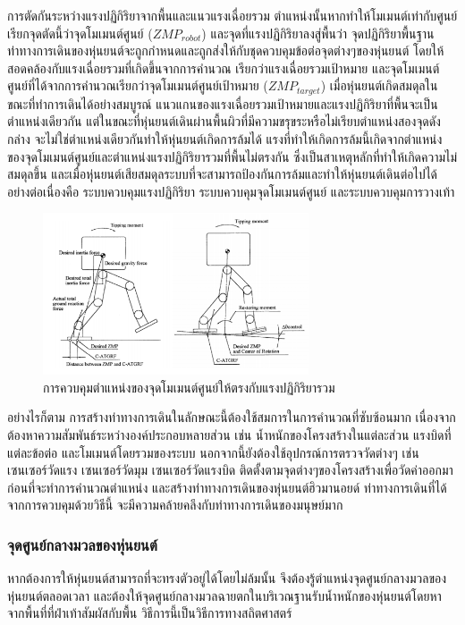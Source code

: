การตัดกันระหว่างแรงปฏิกิริยาจากพื้นและแนวแรงเฉื่อยรวม ตำแหน่งนั้นหากทำให้โมเมนต์เท่ากับศูนย์
เรียกจุดตัดนี้ว่าจุดโมเมนต์ศูนย์ ($ZMP_{robot}$) และจุดที่แรงปฏิกิริยาลงสู่พื้นว่า จุดปฏิกิริยาพื้นฐาน 
ท่าทางการเดินของหุ่นยนต์จะถูกกำหนดและถูกส่งให้กับชุดควบคุมข้อต่อจุดต่างๆของหุ่นยนต์ โดยให้สอดคล้องกับแรงเฉื่อยรวมที่เกิดขึ้นจากการคำนวณ
เรียกว่าแรงเฉื่อยรวมเป้าหมาย และจุดโมเมนต์ศูนย์ที่ได้จากการคำนวณเรียกว่าจุดโมเมนต์ศูนย์เป้าหมาย ($ZMP_{target}$)
เมื่อหุ่นยนต์เกิดสมดุลในขณะที่ทำการเดินได้อย่างสมบูรณ์ แนวแกนของแรงเฉื่อยรวมเป้าหมายและแรงปฏิกิริยาที่พื้นจะเป็นตำแหน่งเดียวกัน
แต่ในขณะที่หุ่นยนต์เดินผ่านพื้นผิวที่มีความขรุขระหรือไม่เรียบตำแหน่งสองจุดดังกล่าง จะไม่ใช่ตำแหน่งเดียวกันทำให้หุ่นยนต์เกิดการล้มได้
แรงที่ทำให้เกิดการล้มนี้เกิดจากตำแหน่งของจุดโมเมนต์ศูนย์และตำแหน่งแรงปฏิกิริยารวมที่พื้นไม่ตรงกัน ซึ่งเป็นสาเหตุหลักที่ทำให้เกิดความไม่สมดุลขึ้น
และเมื่อหุ่นยนต์เสียสมดุลระบบที่จะสามารถป้องกันการล้มและทำให้หุ่นยนต์เดินต่อไปได้อย่างต่อเนื่องคือ ระบบควบคุมแรงปฏิกิริยา
ระบบควบคุมจุดโมเมนต์ศูนย์ และระบบควบคุมการวางเท้า

\begin{figure}[htbp]
	\centering
	\includegraphics[width=0.7\textwidth]{chapter2/images/zmpdynamicwalking.png}
	\caption{การควบคุมตำแหน่งของจุดโมเมนต์ศูนย์ให้ตรงกับแรงปฏิกิริยารวม}
	\label{fig:robot_zmp_support}
\end{figure}

อย่างไรก็ตาม การสร้างท่าทางการเดินในลักษณะนี้ต้องใช้สมการในการคำนวณที่ซับซ้อนมาก
เนื่องจากต้องหาความสัมพันธ์ระหว่างองค์ประกอบหลายส่วน เช่น น้ำหนักของโครงสร้างในแต่ละส่วน 
แรงบิดที่แต่ละข้อต่อ และโมเมนต์โดยรวมของระบบ นอกจากนี้ยังต้องใช้อุปกรณ์การตรวจวัดต่างๆ เช่น เซนเซอร์วัดแรง
เซนเซอร์วัดมุม เซนเซอร์วัดแรงบิด ติดตั้งตามจุดต่างๆของโครงสร้างเพื่อวัดค่าออกมา ก่อนที่จะทำการคำนวณตำแหน่ง
และสร้างท่าทางการเดินของหุ่นยนต์ฮิวมานอยด์ ท่าทางการเดินที่ได้จากการควบคุมด้วยวิธีนี้ จะมีความคล้ายคลึงกับท่าทางการเดินของมนุษย์มาก

\subsubsection{จุดศูนย์กลางมวลของหุ่นยนต์}
หากต้องการให้หุ่นยนต์สามารถที่จะทรงตัวอยู่ได้โดยไม่ล้มนั้น จึงต้องรู้ตำแหน่งจุดศูนย์กลางมวลของหุ่นยนต์ตลอดเวลา
และต้องให้จุดศูนย์กลางมวลฉายตกในบริเวณฐานรับน้ำหนักของหุ่นยนต์โดยหาจากพื้นที่ที่ฝ่าเท้าสัมผัสกับพื้น
วิธีการนี้เป็นวิธีการทางสถิตศาสตร์